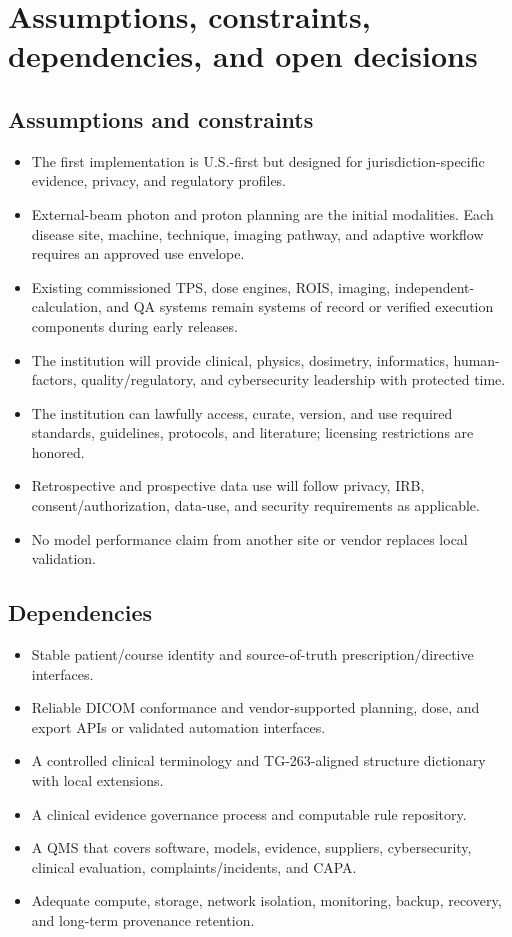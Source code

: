 \documentclass[11pt,letterpaper]{article}
\begin{document}
\section{Assumptions, constraints, dependencies, and open decisions}

\subsection{Assumptions and constraints}

\begin{itemize}
\item The first implementation is U.S.-first but designed for jurisdiction-specific evidence, privacy, and regulatory profiles.
\item External-beam photon and proton planning are the initial modalities. Each disease site, machine, technique, imaging pathway, and adaptive workflow requires an approved use envelope.
\item Existing commissioned TPS, dose engines, ROIS, imaging, independent-calculation, and QA systems remain systems of record or verified execution components during early releases.
\item The institution will provide clinical, physics, dosimetry, informatics, human-factors, quality\slash\allowbreak{}regulatory, and cybersecurity leadership with protected time.
\item The institution can lawfully access, curate, version, and use required standards, guidelines, protocols, and literature; licensing restrictions are honored.
\item Retrospective and prospective data use will follow privacy, IRB, consent\slash\allowbreak{}authorization, data-use, and security requirements as applicable.
\item No model performance claim from another site or vendor replaces local validation.
\end{itemize}

\subsection{Dependencies}

\begin{itemize}
\item Stable patient\slash\allowbreak{}course identity and source-of-truth prescription\slash\allowbreak{}directive interfaces.
\item Reliable DICOM conformance and vendor-supported planning, dose, and export APIs or validated automation interfaces.
\item A controlled clinical terminology and TG-263-aligned structure dictionary with local extensions.
\item A clinical evidence governance process and computable rule repository.
\item A QMS that covers software, models, evidence, suppliers, cybersecurity, clinical evaluation, complaints\slash\allowbreak{}incidents, and CAPA.
\item Adequate compute, storage, network isolation, monitoring, backup, recovery, and long-term provenance retention.
\end{itemize}
\end{document}
